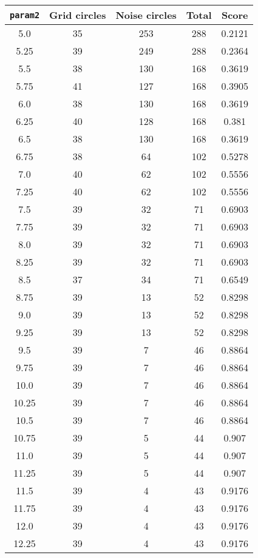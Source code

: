 \documentclass[letterpaper, 12pt]{article}
\begin{document}
\begin{longtable}{|c|c|c|c|c|}
\hline
\textbf{\texttt{param2}} & \textbf{Grid circles} & \textbf{Noise circles} & \textbf{Total} & \textbf{Score} \\
\hline
5.0 & 35 & 253 & 288 & 0.2121 \\
\hline
5.25 & 39 & 249 & 288 & 0.2364 \\
\hline
5.5 & 38 & 130 & 168 & 0.3619 \\
\hline
5.75 & 41 & 127 & 168 & 0.3905 \\
\hline
6.0 & 38 & 130 & 168 & 0.3619 \\
\hline
6.25 & 40 & 128 & 168 & 0.381 \\
\hline
6.5 & 38 & 130 & 168 & 0.3619 \\
\hline
6.75 & 38 & 64 & 102 & 0.5278 \\
\hline
7.0 & 40 & 62 & 102 & 0.5556 \\
\hline
7.25 & 40 & 62 & 102 & 0.5556 \\
\hline
7.5 & 39 & 32 & 71 & 0.6903 \\
\hline
7.75 & 39 & 32 & 71 & 0.6903 \\
\hline
8.0 & 39 & 32 & 71 & 0.6903 \\
\hline
8.25 & 39 & 32 & 71 & 0.6903 \\
\hline
8.5 & 37 & 34 & 71 & 0.6549 \\
\hline
8.75 & 39 & 13 & 52 & 0.8298 \\
\hline
9.0 & 39 & 13 & 52 & 0.8298 \\
\hline
9.25 & 39 & 13 & 52 & 0.8298 \\
\hline
9.5 & 39 & 7 & 46 & 0.8864 \\
\hline
9.75 & 39 & 7 & 46 & 0.8864 \\
\hline
10.0 & 39 & 7 & 46 & 0.8864 \\
\hline
10.25 & 39 & 7 & 46 & 0.8864 \\
\hline
10.5 & 39 & 7 & 46 & 0.8864 \\
\hline
10.75 & 39 & 5 & 44 & 0.907 \\
\hline
11.0 & 39 & 5 & 44 & 0.907 \\
\hline
11.25 & 39 & 5 & 44 & 0.907 \\
\hline
11.5 & 39 & 4 & 43 & 0.9176 \\
\hline
11.75 & 39 & 4 & 43 & 0.9176 \\
\hline
12.0 & 39 & 4 & 43 & 0.9176 \\
\hline
12.25 & 39 & 4 & 43 & 0.9176 \\
\hline

\end{longtable}
\end{document}
